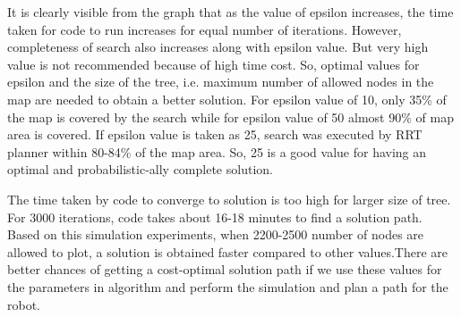 \documentclass[12pt]{article}
\begin{document}
It is clearly visible from the graph that as the value of epsilon increases, the time taken for code to run increases for equal number of iterations. However, completeness of search also increases along with epsilon value. But very high value is not recommended because of high time cost. So, optimal values for epsilon and the size of the tree, i.e. maximum number of allowed nodes in the map are needed to obtain a better solution. For epsilon value of 10, only 35\% of the map is covered by the search while for epsilon value of 50 almost 90\% of map area is covered. If epsilon value is taken as 25, search was executed by RRT planner within 80-84\% of the map area. So, 25 is a good value for having an optimal and probabilistic-ally complete solution.

The time taken by code to converge to solution is too high for larger size of tree. For 3000 iterations, code takes about 16-18 minutes to find a solution path. Based on this simulation experiments, when 2200-2500 number of nodes are allowed to plot, a solution is obtained faster compared to other values.There are better chances of getting a cost-optimal solution path if we use these values for the parameters in algorithm and perform the simulation and plan a path for the robot.

\newpage
\end{document}
